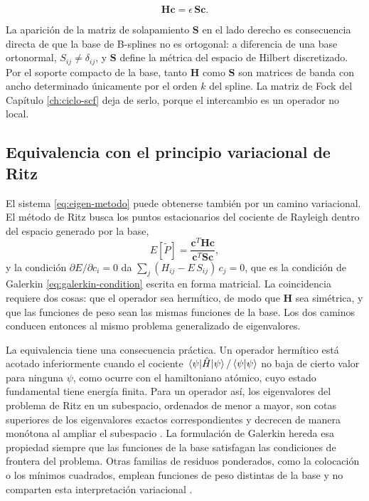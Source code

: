 \begin{equation}
\label{eq:eigen-metodo}
  \bm{H}\bm{c} = \epsilon\, \bm{S}\bm{c}.
\end{equation}

La aparición de la matriz de solapamiento $\bm{S}$ en el lado derecho es consecuencia directa de que la base de B-splines no es ortogonal: a diferencia de una base ortonormal, $S_{ij} \neq \delta_{ij}$, y $\bm{S}$ define la métrica del espacio de Hilbert discretizado. Por el soporte compacto de la base, tanto $\bm{H}$ como $\bm{S}$ son matrices de banda con ancho determinado únicamente por el orden $k$ del spline. La matriz de Fock del Capítulo \ref{ch:ciclo-scf} deja de serlo, porque el intercambio es un operador no local.

\subsection{Equivalencia con el principio variacional de Ritz}
\label{sec:ritz-galerkin}

El sistema \eqref{eq:eigen-metodo} puede obtenerse también por un camino variacional. El método de Ritz busca los puntos estacionarios del cociente de Rayleigh dentro del espacio generado por la base,
\begin{equation}
\label{eq:rayleigh}
  E[\tilde{P}] = \frac{\bm{c}^{T}\bm{H}\bm{c}}{\bm{c}^{T}\bm{S}\bm{c}},
\end{equation}
y la condición $\partial E/\partial c_i = 0$ da $\sum_j (H_{ij} - E\,S_{ij})\,c_j = 0$, que es la condición de Galerkin \eqref{eq:galerkin-condition} escrita en forma matricial. La coincidencia requiere dos cosas: que el operador sea hermítico, de modo que $\bm{H}$ sea simétrica, y que las funciones de peso sean las mismas funciones de la base. Los dos caminos conducen entonces al mismo problema generalizado de eigenvalores.

La equivalencia tiene una consecuencia práctica. Un operador hermítico está acotado inferiormente cuando el cociente $\ev{\hat{H}}{\psi}/\braket{\psi}$ no baja de cierto valor para ninguna $\psi$, como ocurre con el hamiltoniano atómico, cuyo estado fundamental tiene energía finita. Para un operador así, los eigenvalores del problema de Ritz en un subespacio, ordenados de menor a mayor, son cotas superiores de los eigenvalores exactos correspondientes y decrecen de manera monótona al ampliar el subespacio \parencite{MacDonald1933}. La formulación de Galerkin hereda esa propiedad siempre que las funciones de la base satisfagan las condiciones de frontera del problema. Otras familias de residuos ponderados, como la colocación o los mínimos cuadrados, emplean funciones de peso distintas de la base y no comparten esta interpretación variacional \parencite{Finlayson1965}.

